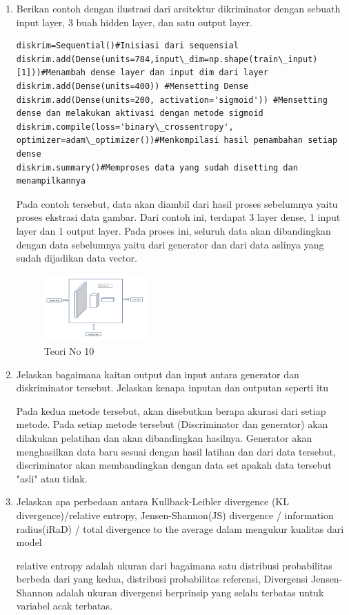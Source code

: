 \begin{enumerate}
            \item Berikan contoh dengan ilustrasi dari arsitektur dikriminator dengan sebuath input layer, 3 buah hidden layer, dan satu output layer.
\begin{verbatim}
diskrim=Sequential()#Inisiasi dari sequensial
diskrim.add(Dense(units=784,input\_dim=np.shape(train\_input)[1]))#Menambah dense layer dan input dim dari layer
diskrim.add(Dense(units=400)) #Mensetting Dense
diskrim.add(Dense(units=200, activation='sigmoid')) #Mensetting dense dan melakukan aktivasi dengan metode sigmoid
diskrim.compile(loss='binary\_crossentropy', optimizer=adam\_optimizer())#Menkompilasi hasil penambahan setiap dense
diskrim.summary()#Memproses data yang sudah disetting dan menampilkannya
\end{verbatim}
            \par Pada contoh tersebut, data akan diambil dari hasil proses sebelumnya yaitu proses ekstrasi data gambar. Dari contoh ini, terdapat 3 layer dense, 1 input layer dan 1 output layer. Pada proses ini, seluruh data akan dibandingkan dengan data sebelumnya yaitu dari generator dan dari data aslinya yang sudah dijadikan data vector. 
            \begin{figure}[H]
                \includegraphics[width=4cm]{figures/1174086/chapter8/teori10.png}
                \centering
                  \caption{Teori No 10}
            \end{figure}
            
            \item Jelaskan bagaimana kaitan output dan input antara generator dan diskriminator tersebut. Jelaskan kenapa inputan dan outputan seperti itu
            \par Pada kedua metode tersebut, akan disebutkan berapa akurasi dari setiap metode. Pada setiap metode tersebut (Discriminator dan generator) akan dilakukan pelatihan dan akan dibandingkan hasilnya. Generator akan menghasilkan data baru sesuai dengan hasil latihan dan dari data tersebut, discriminator akan membandingkan dengan data set apakah data tersebut "asli" atau tidak.
            
            \item Jelaskan apa perbedaan antara Kullback-Leibler divergence (KL divergence)/relative entropy, Jensen-Shannon(JS) divergence / information radius(iRaD) / total divergence to the average dalam mengukur kualitas dari model
            \par relative entropy adalah ukuran dari bagaimana satu distribusi probabilitas berbeda dari yang kedua, distribusi probabilitas referensi, Divergensi Jensen-Shannon adalah ukuran divergensi berprinsip yang selalu terbatas untuk variabel acak terbatas.


\end{enumerate}
